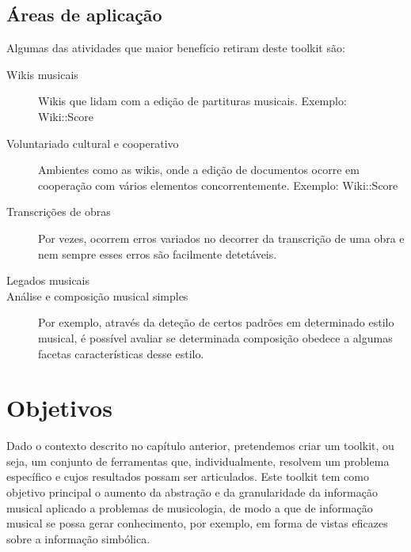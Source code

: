 \documentclass[runningheads,a4paper]{llncs}
\begin{document}
\subsection{Áreas de aplicação}
Algumas das atividades que maior benefício retiram deste toolkit são:
\begin{description}
\item[Wikis musicais]
Wikis que lidam com a edição de partituras musicais. Exemplo: Wiki::Score
\item[Voluntariado cultural e cooperativo]
Ambientes como as wikis, onde a edição de documentos ocorre em cooperação com vários elementos
concorrentemente. Exemplo: Wiki::Score
\item[Transcrições de obras]
Por vezes, ocorrem erros variados no decorrer da transcrição de uma obra e nem sempre esses erros
são facilmente detetáveis.
\item[Legados musicais]
\item[Análise e composição musical simples]
Por exemplo, através da deteção de certos padrões em determinado estilo musical, é possível avaliar
se determinada composição obedece a algumas facetas características desse estilo.

\end{description}



\section{Objetivos}
Dado o contexto descrito no capítulo anterior, pretendemos criar um toolkit, ou seja, um conjunto de
ferramentas que, individualmente, resolvem um problema específico e cujos resultados possam ser
articulados. Este toolkit tem como objetivo principal o aumento da abstração e da granularidade da
informação musical aplicado a problemas de musicologia, de modo a que de informação musical se possa
gerar conhecimento, por exemplo, em forma de vistas eficazes sobre a informação simbólica.
\end{document}
